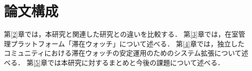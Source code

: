 \section{論文構成}\label{1.3}
第\ref{2}章では，本研究と関連した研究との違いを比較する．
第\ref{3}章では，在室管理プラットフォーム「滞在ウォッチ」について述べる．
第\ref{4}章では，独立したコミュニティにおける滞在ウォッチの安定運用のためのシステム拡張について述べる．
第\ref{5}章では本研究に対するまとめと今後の課題について述べる．
\thispagestyle{myheadings}

